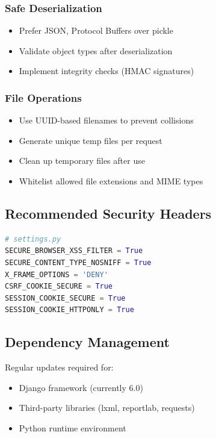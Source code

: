 \documentclass[12pt,a4paper]{article}
\begin{document}
\subsubsection{Safe Deserialization}
\begin{itemize}[leftmargin=*]
    \item Prefer JSON, Protocol Buffers over pickle
    \item Validate object types after deserialization
    \item Implement integrity checks (HMAC signatures)
\end{itemize}

\subsubsection{File Operations}
\begin{itemize}[leftmargin=*]
    \item Use UUID-based filenames to prevent collisions
    \item Generate unique temp files per request
    \item Clean up temporary files after use
    \item Whitelist allowed file extensions and MIME types
\end{itemize}

\subsection{Recommended Security Headers}

\begin{lstlisting}[language=Python]
# settings.py
SECURE_BROWSER_XSS_FILTER = True
SECURE_CONTENT_TYPE_NOSNIFF = True
X_FRAME_OPTIONS = 'DENY'
CSRF_COOKIE_SECURE = True
SESSION_COOKIE_SECURE = True
SESSION_COOKIE_HTTPONLY = True
\end{lstlisting}

\subsection{Dependency Management}

Regular updates required for:
\begin{itemize}[leftmargin=*]
    \item Django framework (currently 6.0)
    \item Third-party libraries (lxml, reportlab, requests)
    \item Python runtime environment
\end{itemize}
\end{document}

